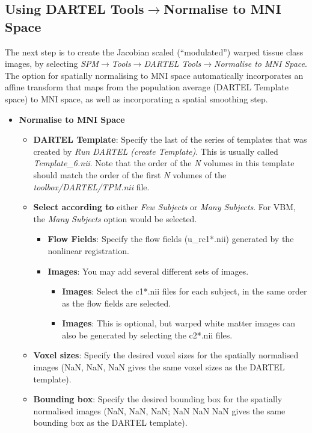 \subsection{Using DARTEL Tools$\rightarrow$Normalise to MNI Space}
The next step is to create the Jacobian scaled (``modulated'') warped tissue class images, by selecting \emph{SPM$\rightarrow$Tools$\rightarrow$DARTEL Tools$\rightarrow$Normalise to MNI Space}.
The option for spatially normalising to MNI space automatically incorporates an affine transform that maps from the population average (DARTEL Template space) to MNI space, as well as incorporating a spatial smoothing step.
\begin{itemize}
\item{{\bf Normalise to MNI Space}
  \begin{itemize}
  \item{{\bf DARTEL Template}: Specify the last of the series of templates that was created by \emph{Run DARTEL (create Template)}.  This is usually called \emph{Template\_6.nii}.  Note that the order of the \emph{N} volumes in this template should match the order of the first \emph{N} volumes of the \emph{toolbox/DARTEL/TPM.nii} file.}
  \item{{\bf Select according to} either \emph{Few Subjects} or \emph{Many Subjects}.  For VBM, the \emph{Many Subjects} option would be selected.
    \begin{itemize}
    \item{{\bf Flow Fields}: Specify the flow fields (u\_rc1*.nii) generated by the nonlinear registration.}
    \item{{\bf Images}: You may add several different sets of images.
      \begin{itemize}
      \item{{\bf Images}: Select the c1*.nii files for each subject, in the same order as the flow fields are selected.}
      \item{{\bf Images}: This is optional, but warped white matter images can also be generated by selecting the c2*.nii files.}
      \end{itemize}}
    \end{itemize}}
    \item{{\bf Voxel sizes}: Specify the desired voxel sizes for the spatially normalised images (NaN, NaN, NaN gives the same voxel sizes as the DARTEL template).}
    \item{{\bf Bounding box}: Specify the desired bounding box for the spatially normalised images (NaN, NaN, NaN; NaN NaN NaN gives the same bounding box as the DARTEL template).}

\end{itemize}}
\end{itemize}
